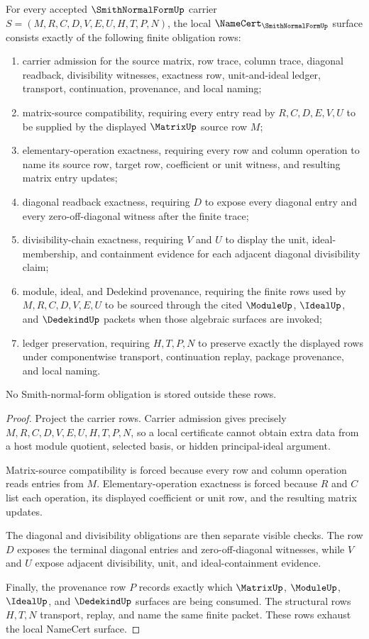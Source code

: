 \begin{theorem}
\label{thm:smith-normal-form-namecert-obligations}
For every accepted $\SmithNormalFormUp$ carrier $S=(M,R,C,D,V,E,U,H,T,P,N)$, the local $\NameCert_{\SmithNormalFormUp}$ surface consists exactly of the following finite obligation rows:
\begin{enumerate}
\item carrier admission for the source matrix, row trace, column trace, diagonal readback, divisibility witnesses, exactness row, unit-and-ideal ledger, transport, continuation, provenance, and local naming;
\item matrix-source compatibility, requiring every entry read by $R,C,D,E,V,U$ to be supplied by the displayed $\MatrixUp$ source row $M$;
\item elementary-operation exactness, requiring every row and column operation to name its source row, target row, coefficient or unit witness, and resulting matrix entry updates;
\item diagonal readback exactness, requiring $D$ to expose every diagonal entry and every zero-off-diagonal witness after the finite trace;
\item divisibility-chain exactness, requiring $V$ and $U$ to display the unit, ideal-membership, and containment evidence for each adjacent diagonal divisibility claim;
\item module, ideal, and Dedekind provenance, requiring the finite rows used by $M,R,C,D,V,E,U$ to be sourced through the cited $\ModuleUp$, $\IdealUp$, and $\DedekindUp$ packets when those algebraic surfaces are invoked;
\item ledger preservation, requiring $H,T,P,N$ to preserve exactly the displayed rows under componentwise transport, continuation replay, package provenance, and local naming.
\end{enumerate}
No Smith-normal-form obligation is stored outside these rows.
\end{theorem}
\begin{proof}
Project the carrier rows. Carrier admission gives precisely $M,R,C,D,V,E,U,H,T,P,N$, so a local certificate cannot obtain extra data from a host module quotient, selected basis, or hidden principal-ideal argument.

Matrix-source compatibility is forced because every row and column operation reads entries from $M$. Elementary-operation exactness is forced because $R$ and $C$ list each operation, its displayed coefficient or unit row, and the resulting matrix updates.

The diagonal and divisibility obligations are then separate visible checks. The row $D$ exposes the terminal diagonal entries and zero-off-diagonal witnesses, while $V$ and $U$ expose adjacent divisibility, unit, and ideal-containment evidence.

Finally, the provenance row $P$ records exactly which $\MatrixUp$, $\ModuleUp$, $\IdealUp$, and $\DedekindUp$ surfaces are being consumed. The structural rows $H,T,N$ transport, replay, and name the same finite packet. These rows exhaust the local NameCert surface.
\end{proof}

